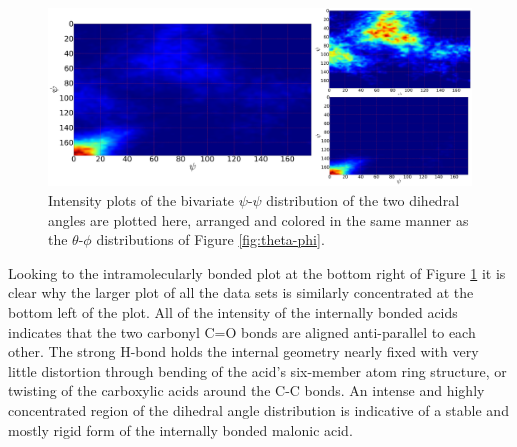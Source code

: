 \begin{figure}[h!]
	\begin{center}
		\includegraphics[scale=1.0]{images/orientation/psi-psi.png}
		\caption{Intensity plots of the bivariate $\psi$-$\psi$ distribution of the two dihedral angles are plotted here, arranged and colored in the same manner as the $\theta$-$\phi$ distributions of Figure \ref{fig:theta-phi}.} 
		\label{fig:psi-psi}
	\end{center}
\end{figure}

Looking to the intramolecularly bonded plot at the bottom right of Figure \ref{fig:psi-psi} it is clear why the larger plot of all the data sets is similarly concentrated at the bottom left of the plot. All of the intensity of the internally bonded acids indicates that the two carbonyl C=O bonds are aligned anti-parallel to each other. The strong H-bond holds the internal geometry nearly fixed with very little distortion through bending of the acid's six-member atom ring structure, or twisting of the carboxylic acids around the C-C bonds. An intense and highly concentrated region of the dihedral angle distribution is indicative of a stable and mostly rigid form of the internally bonded malonic acid.

